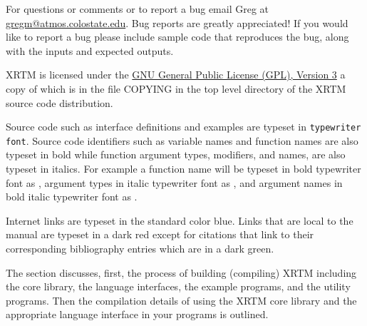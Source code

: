 For questions or comments or to report a bug email Greg at \href{mailto:gregm@atmos.colostate.edu}{gregm@atmos.colostate.edu}.  Bug reports are greatly appreciated!  If you would like to report a bug please include sample code that reproduces the bug, along with the inputs and expected outputs.


%
\label{introduction_to_xrtm_license}

XRTM is licensed under the \href{http://www.gnu.org/licenses/gpl.html}{GNU General Public License (GPL), Version 3} a copy of which is in the file COPYING in the top level directory of the XRTM source code distribution.


%
\label{introduction_to_xrtm_conventions_used_in_this_manual}

Source code such as interface definitions and examples are typeset in \texttt{typewriter font}.  Source code identifiers such as variable names and function names are also typeset in bold while function argument types, modifiers, and names, are also typeset in italics.  For example a function name will be typeset in bold typewriter font as , argument types in italic typewriter font as , and argument names in bold italic typewriter font as .

Internet links are typeset in the standard color \textcolor{urlcolor}{blue}.  Links that are local to the manual are typeset in a \textcolor{linkscolor}{dark red} except for citations that link to their corresponding bibliography entries which are in a \textcolor{citescolor}{dark green}.


%
\label{building_and_using_xrtm}

The section discusses, first, the process of building (compiling) XRTM including the core library, the language interfaces, the example programs, and the utility programs.  Then the compilation details of using the XRTM core library and the appropriate language interface in your programs is outlined.


